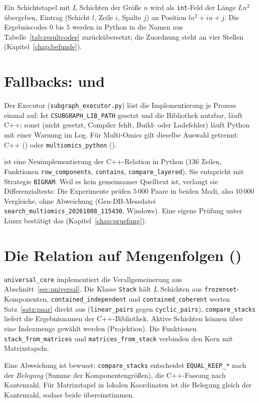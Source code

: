 Ein Schichtstapel mit $L$ Schichten der Größe $n$ wird als \texttt{int}-Feld der Länge $L n^2$ übergeben, Eintrag (Schicht $l$, Zeile $i$, Spalte $j$) an Position $l n^2+i n+j$. Die Ergebniscodes $0$ bis $5$ werden in Python in die Namen aus Tabelle~\ref{tab:resultcodes} zurückübersetzt; die Zuordnung steht an vier Stellen (Kapitel~\ref{chap:befunde}).

\section{Fallbacks:  und }
\label{sec:gendb_fallbacks}

Der Executor (\texttt{subgraph\_executor.py}) löst die Implementierung je Prozess einmal auf: Ist \texttt{CSUBGRAPH\_LIB\_PATH} gesetzt und die Bibliothek nutzbar, läuft C++; sonst (nicht gesetzt, Compiler fehlt, Build- oder Ladefehler) läuft Python mit einer Warnung im Log. Für Multi-Omics gilt dieselbe Auswahl getrennt: C++ () oder \texttt{multiomics\_python} ().

 ist eine Neuimplementierung der C++-Relation in Python (136 Zeilen, Funktionen \texttt{row\_components}, \texttt{contains}, \texttt{compare\_layered}). Sie entspricht  mit Strategie \texttt{BIGRAM}. Weil es kein gemeinsamer Quelltext ist, verlangt sie Differenzialtests: Die Experimente prüfen $5\,000$ Paare in beiden Modi, also $10\,000$ Vergleiche, ohne Abweichung (Gen-DB-Messdatei \texttt{search\_multiomics\_20261008\_115430}, Windows). Eine eigene Prüfung unter Linux bestätigt das (Kapitel~\ref{chap:pruefung}).

\section{Die Relation auf Mengenfolgen ()}

\texttt{universal\_core} implementiert die Verallgemeinerung aus Abschnitt~\ref{sec:universal}. Die Klasse \texttt{Stack} hält $L$ Schichten aus \texttt{frozenset}-Komponenten, \texttt{contained\_independent} und \texttt{contained\_coherent} werten Satz~\ref{satz:paar} direkt aus (\texttt{linear\_pairs} gegen \texttt{cyclic\_pairs}), \texttt{compare\_stacks} liefert die Ergebnisnamen der C++-Bibliothek. Aktive Schichten können über eine Indexmenge gewählt werden (Projektion). Die Funktionen \texttt{stack\_from\_matrices} und \texttt{matrices\_from\_stack} verbinden den Kern mit Matrixstapeln.

Eine Abweichung ist bewusst: \texttt{compare\_stacks} entscheidet \texttt{EQUAL\_KEEP\_*} nach der \emph{Belegung} (Summe der Komponentengrößen), die C++-Fassung nach Kantenzahl. Für Matrixstapel in lokalen Koordinaten ist die Belegung gleich der Kantenzahl, sodass beide übereinstimmen.

